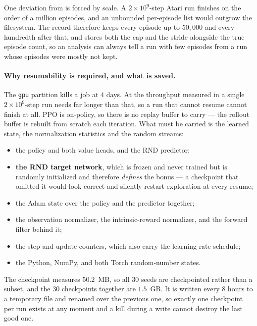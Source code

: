 One deviation from  is forced by scale. A $2\times10^{9}$-step Atari run finishes
on the order of a million episodes, and an unbounded per-episode list would outgrow the filesystem.
The record therefore keeps every episode up to $50{,}000$ and every hundredth after that, and stores
both the cap and the stride alongside the true episode count, so an analysis can always tell a run
with few episodes from a run whose episodes were mostly not kept.

\paragraph{Why resumability is required, and what is saved.}
The \texttt{gpu} partition kills a job at $4$ days. At the throughput measured in
 a single $2\times10^{9}$-step run needs far longer than that, so a run
that cannot resume cannot finish at all. PPO is on-policy, so there is no replay buffer to carry ---
the rollout buffer is rebuilt from scratch each iteration. What must be carried is the learned state,
the normalization statistics and the random streams:

\begin{itemize}[leftmargin=*]
\item the policy and both value heads, and the RND predictor;
\item \textbf{the RND target network}, which is frozen and never trained but is randomly initialized
  and therefore \emph{defines} the bonus --- a checkpoint that omitted it would look correct and
  silently restart exploration at every resume;
\item the Adam state over the policy and the predictor together;
\item the observation normalizer, the intrinsic-reward normalizer, and the forward filter behind it;
\item the step and update counters, which also carry the learning-rate schedule;
\item the Python, NumPy, and both Torch random-number states.
\end{itemize}

The checkpoint measures $50.2$~MB, so all $30$ seeds are checkpointed rather than a subset, and the
$30$ checkpoints together are $1.5$~GB. It is written every $8$ hours to a temporary file and renamed
over the previous one, so exactly one checkpoint per run exists at any moment and a kill during a
write cannot destroy the last good one.

